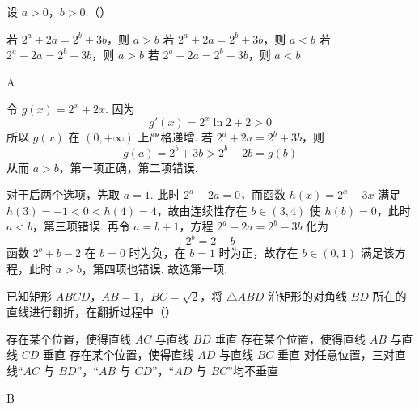 \begin{problem}
设 \(a > 0\)，\(b > 0\).（\quad）

\choices
    {若 \(2^{a} + 2a = 2^{b} + 3b\)，则 \(a > b\)}
    {若 \(2^{a} + 2a = 2^{b} + 3b\)，则 \(a < b\)}
    {若 \(2^{a} - 2a = 2^{b} - 3b\)，则 \(a > b\)}
    {若 \(2^{a} - 2a = 2^{b} - 3b\)，则 \(a < b\)}
\end{problem}

\begin{answer}
A
\end{answer}

\begin{solution}
令 \(g(x)=2^x+2x\). 因为
\[
g'(x)=2^x\ln2+2>0
\]
所以 \(g(x)\) 在 \((0,+\infty)\) 上严格递增. 若 \(2^a+2a=2^b+3b\)，则
\[
g(a)=2^b+3b>2^b+2b=g(b)
\]
从而 \(a>b\)，第一项正确，第二项错误.

对于后两个选项，先取 \(a=1\). 此时 \(2^a-2a=0\)，而函数 \(h(x)=2^x-3x\) 满足 \(h(3)=-1<0<h(4)=4\)，故由连续性存在 \(b\in(3,4)\) 使 \(h(b)=0\)，此时 \(a<b\)，第三项错误. 再令 \(a=b+1\)，方程 \(2^a-2a=2^b-3b\) 化为
\[
2^b=2-b
\]
函数 \(2^b+b-2\) 在 \(b=0\) 时为负，在 \(b=1\) 时为正，故存在 \(b\in(0,1)\) 满足该方程，此时 \(a>b\)，第四项也错误. 故选第一项.
\end{solution}

\begin{problem}
已知矩形 \(ABCD\)，\(AB = 1\)，\(BC = \sqrt{2}\)，将 \(\triangle ABD\) 沿矩形的对角线 \(BD\) 所在的直线进行翻折，在翻折过程中（\quad）

\choices
    {存在某个位置，使得直线 \(AC\) 与直线 \(BD\) 垂直}
    {存在某个位置，使得直线 \(AB\) 与直线 \(CD\) 垂直}
    {存在某个位置，使得直线 \(AD\) 与直线 \(BC\) 垂直}
    {对任意位置，三对直线“\(AC\) 与 \(BD\)”，“\(AB\) 与 \(CD\)”，“\(AD\) 与 \(BC\)”均不垂直}
\end{problem}

\begin{answer}
B
\end{answer}

